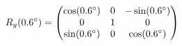 \documentclass[preview]{standalone}
\begin{document}
\begin{align*}
\special{dvisvgm:raw <g id='unique000'>}R_y(0.6^\circ) = \begin{pmatrix} \cos(0.6^\circ) & 0 & -\sin(0.6^\circ) \\ 0 & 1 & 0 \\ \sin(0.6^\circ) & 0 & \cos(0.6^\circ) \end{pmatrix}\special{dvisvgm:raw </g>}
\end{align*}
\end{document}
